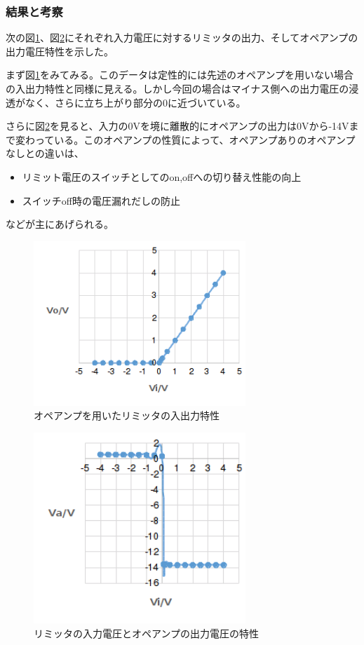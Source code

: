 \documentclass[11pt,a4j]{jsarticle}
\begin{document}
   \subsubsection{結果と考察}
    次の図\ref{fig:1_1_amp_PS_ViVo}、図\ref{fig:1_1_amp_PS_ViVa}にそれぞれ入力電圧に対するリミッタの出力、そしてオペアンプの出力電圧特性を示した。
    
    まず図\ref{fig:1_1_amp_PS_ViVo}をみてみる。このデータは定性的には先述のオペアンプを用いない場合の入出力特性と同様に見える。しかし今回の場合はマイナス側への出力電圧の浸透がなく、さらに立ち上がり部分の0に近づいている。
    
    さらに図\ref{fig:1_1_amp_PS_ViVa}を見ると、入力の0Vを境に離散的にオペアンプの出力は0Vから-14Vまで変わっている。このオペアンプの性質によって、オペアンプありのオペアンプなしとの違いは、
    \begin{itemize}
    \item リミット電圧のスイッチとしてのon,offへの切り替え性能の向上
    \item スイッチoff時の電圧漏れだしの防止
    \end{itemize}
    などが主にあげられる。
    
    \begin{figure}[htbp]
  \centering
  \includegraphics[width=8cm,clip]{1_1_amp_PS_ViVo.png}
  \caption{オペアンプを用いたリミッタの入出力特性}
  \label{fig:1_1_amp_PS_ViVo}
 \end{figure}%
   
   \begin{figure}[htbp]
  \centering
  \includegraphics[width=8cm,clip]{1_1_amp_PS_ViVa.png}
  \caption{リミッタの入力電圧とオペアンプの出力電圧の特性}
  \label{fig:1_1_amp_PS_ViVa}
 \end{figure}%
    
\end{document}
